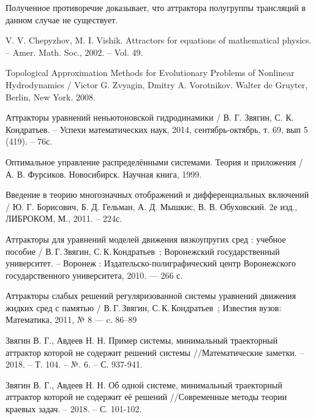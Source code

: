 Полученное противоречие доказывает, что аттрактора полугруппы трансляций в данном случае не существует.



\begin{thebibliography}{99}

 V. V. Chepyzhov, M. I. Vishik. Attractors for equations of mathematical physics. – Amer. Math. Soc., 2002. – Vol. 49.

 Topological Approximation Methods for Evolutionary Problems of Nonlinear Hydrodynamics / Victor G. Zvyagin, Dmitry A. Vorotnikov. Walter de Gruyter, Berlin, New York. 2008.

 Аттракторы уравнений неньютоновской гидродинамики / В. Г. Звягин, С. К. Кондратьев. – Успехи математических наук, 2014, сентябрь-октябрь, т. 69, вып 5 (419). – 76с.

 Оптимальное управление распределёнными системами. Теория и приложения / А. В. Фурсиков. Новосибирск. Научная книга, 1999.

 Введение в теорию многозначных отображений и дифференциальных включений / Ю. Г. Борисович, Б. Д. Гельман, А. Д. Мышкис, В. В. Обуховский.  2е изд., ЛИБРОКОМ, М., 2011. – 224с.

 Аттракторы для уравнений моделей движения вязкоупругих сред : учебное пособие / В.\,Г.\,Звягин, С.\,К.\,Кондратьев~; Воронежский государственный университет. -- Воронеж : Издательско-полиграфический центр Воронежского государственного университета, 2010. --- 266 с.

 Аттракторы слабых решений регуляризованной системы уравнений движения жидких сред с памятью / В.\,Г.\,Звягин, С.\,К.\,Кондратьев~; Известия вузов: Математика, 2011, № 8 --- c. 86–89

 Звягин В. Г., Авдеев Н. Н. Пример системы, минимальный траекторный аттрактор которой не содержит решений системы //Математические заметки. – 2018. – Т. 104. – №. 6. – С. 937-941.

 Звягин В. Г., Авдеев Н. Н. Об одной системе, минимальный траекторный аттрактор которой не содержит её решений //Современные методы теории краевых задач. – 2018. – С. 101-102.

\end{thebibliography}
